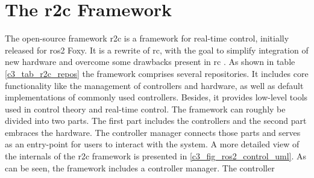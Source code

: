 \section{The \gls{r2c} Framework}\label{ros2_control}
The open-source framework \gls{r2c} is a framework for real-time control, initially released for \gls{ros2} Foxy. It is a rewrite of \gls{rc}, with the goal to simplify integration of new hardware and overcome some drawbacks present in \gls{rc} \cite{noauthor_welcome_nodate, magyar_getting_started_with_ros2_control_2021, magyar_ros2_control_the_future_of_ros_control_2021}. As shown in table \ref{c3_tab_r2c_repos} the framework comprises several repositories. It includes core functionality like the management of controllers and hardware, as well as default implementations of commonly used controllers. Besides, it provides low-level tools used in control theory and real-time control. \newline
The framework can roughly be divided into two parts. The first part includes the controllers and the second part embraces the hardware. The controller manager connects those parts and serves as an entry-point for users to interact with the system. A more detailed view of the internals of the \gls{r2c} framework is presented in \autoref{c3_fig_ros2_control_uml}. As can be seen, the framework includes a controller manager. The controller 
